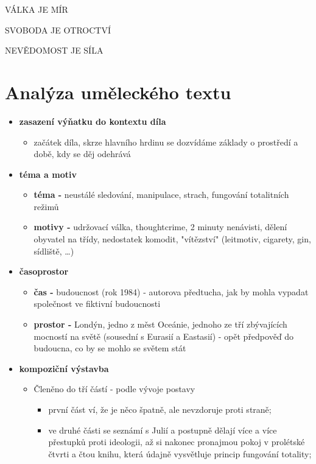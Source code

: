 \documentclass[11pt]{article}
\begin{document}
VÁLKA JE MÍR

SVOBODA JE OTROCTVÍ

NEVĚDOMOST JE SÍLA
    \section*{Analýza uměleckého textu}
    \begin{itemize}
        \item\textbf{zasazení výňatku do kontextu díla}
        \begin{itemize}
            \item začátek díla, skrze hlavního hrdinu se dozvídáme základy o prostředí a době, kdy se děj odehrává
        \end{itemize}
        \item\textbf{téma a motiv}
        \begin{itemize}
            \item \textbf{téma - }neustálé sledování, manipulace, strach, fungování totalitních režimů
            \item \textbf{motivy - }udržovací válka, thoughtcrime, 2 minuty nenávisti, dělení obyvatel na třídy, nedostatek komodit, "vítězství" (leitmotiv, cigarety, gin, sídliště, \dots)
        \end{itemize}
        \item\textbf{časoprostor}
        \begin{itemize}
            \item \textbf{čas - }budoucnost (rok 1984) - autorova předtucha, jak by mohla vypadat společnost ve fiktivní budoucnosti
            \item \textbf{prostor - }Londýn, jedno z měst Oceánie, jednoho ze tří zbývajících mocností na světě (sousední s Eurasií a Eastasií) - opět předpověď do budoucna, co by se mohlo se světem stát
        \end{itemize}
        \item\textbf{kompoziční výstavba}
        \begin{itemize}
            \item Členěno do tří částí - podle vývoje postavy
            \begin{itemize}
                \item první část ví, že je něco špatně, ale nevzdoruje proti straně;
                \item ve druhé části se seznámí s Julií a postupně dělají více a více přestupků proti ideologii, až si nakonec pronajmou pokoj v prolétské čtvrti a čtou knihu, která údajně vysvětluje princip fungování totality;

\end{itemize}
\end{itemize}
\end{itemize}
\end{document}
